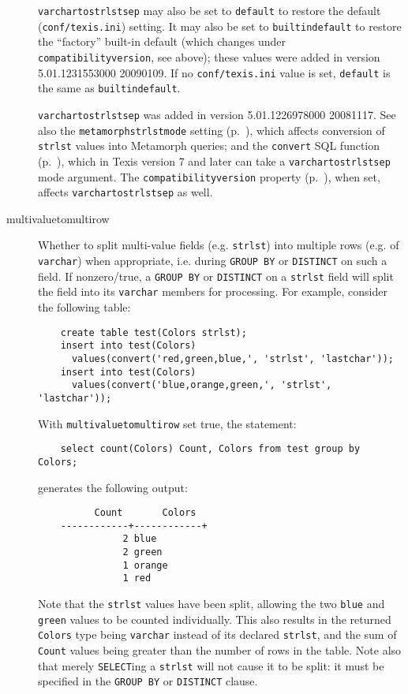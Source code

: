 \begin{description}
  \verb`varchartostrlstsep` may also be set to \verb`default` to
  restore the default (\verb`conf/texis.ini`) setting.  It may also be
  set to \verb`builtindefault` to restore the ``factory'' built-in
  default (which changes under \verb`compatibilityversion`, see
  above); these values were added in version 5.01.1231553000 20090109.
  If no \verb`conf/texis.ini` value is set, \verb`default` is the same
  as \verb`builtindefault`.

  \verb`varchartostrlstsep` was added in version 5.01.1226978000
  20081117.  See also the \verb`metamorphstrlstmode` setting
  (p.~\pageref{`metamorphstrlstmode'}), which affects conversion of
  \verb`strlst` values into Metamorph queries; and the \verb`convert`
  SQL function (p.~\pageref{convertSqlFunction}), which in Texis
  version 7 and later can take a \verb`varchartostrlstsep` mode
  argument.  The \verb`compatibilityversion` property
  (p.~\pageref{SqlPropertyCompatibilityVersion}), when set, affects
  \verb`varchartostrlstsep` as well.

\item[multivaluetomultirow]
\label{multivaluetomultirow}
  Whether to split multi-value fields (e.g. \verb`strlst`) into
  multiple rows (e.g. of \verb`varchar`) when appropriate, i.e. during
  {\tt GROUP BY} or {\tt DISTINCT} on such a field.  If nonzero/true,
  a {\tt GROUP BY} or {\tt DISTINCT} on a \verb`strlst` field will
  split the field into its \verb`varchar` members for processing.  For
  example, consider the following table:
  \begin{verbatim}
    create table test(Colors strlst);
    insert into test(Colors)
      values(convert('red,green,blue,', 'strlst', 'lastchar'));
    insert into test(Colors)
      values(convert('blue,orange,green,', 'strlst', 'lastchar'));
  \end{verbatim}
  With \verb`multivaluetomultirow` set true, the statement:
  \begin{verbatim}
    select count(Colors) Count, Colors from test group by Colors;
  \end{verbatim}
  generates the following output:
  \begin{verbatim}
          Count       Colors
    ------------+------------+
               2 blue
               2 green
               1 orange
               1 red
  \end{verbatim}
  Note that the \verb`strlst` values have been split, allowing the two
  \verb`blue` and \verb`green` values to be counted individually.
  This also results in the returned \verb`Colors` type being
  \verb`varchar` instead of its declared \verb`strlst`, and the sum of
  \verb`Count` values being greater than the number of rows in the
  table.  Note also that merely \verb`SELECT`ing a \verb`strlst` will
  not cause it to be split: it must be specified in the {\tt GROUP BY}
  or {\tt DISTINCT} clause.


\end{description}
